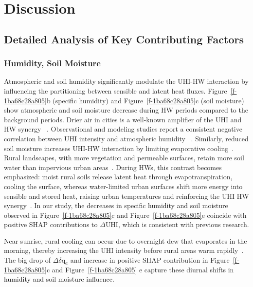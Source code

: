\section*{Discussion}




\subsection*{Detailed Analysis of Key Contributing Factors}



\subsubsection*{Humidity, Soil Moisture}Atmospheric and soil humidity significantly modulate the UHI-HW interaction by influencing the partitioning between sensible and latent heat fluxes. Figure~\ref{f-1ba68c28a805}b (specific humidity) and Figure~\ref{f-1ba68c28a805}c (soil moisture) show atmospheric and soil moisture decrease during HW periods compared to the background periods. Drier air in cities is a well-known amplifier of the UHI and HW synergy\unskip~\cite{2755510:33598950,2755510:33598924,2755510:33598925,2755510:33598926,2755510:33598952} . Observational and modeling studies report a consistent negative correlation between UHI intensity and atmospheric humidity\unskip~\cite{2755510:33598949,2755510:33598952,2755510:33598937} . Similarly, reduced soil moisture increases UHI-HW interaction by limiting evaporative cooling\unskip~\cite{2755510:33598950,2755510:33598925,2755510:33598926,2755510:33598915}. Rural landscapes, with more vegetation and permeable surfaces, retain more soil water than impervious urban areas\unskip~\cite{2755510:33598915,2755510:33598938}. During HWs, this contrast becomes emphasized: moist rural soils release latent heat through evapotranspiration, cooling the surface, whereas water-limited urban surfaces shift more energy into sensible and stored heat, raising urban temperatures and reinforcing the UHI HW synergy\unskip~\cite{2755510:33598924,2755510:33598925,2755510:33598926,2755510:33598935}. In our study, the decreases in specific humidity and soil moisture observed in Figure~\ref{f-1ba68c28a805}c and Figure~\ref{f-1ba68c28a805}e coincide with positive SHAP contributions to \ensuremath{\Delta }UHI, which is consistent with previous research.

Near sunrise, rural cooling can occur due to overnight dew that evaporates in the morning, thereby increasing the UHI intensity before rural areas warm rapidly\unskip~\cite{2755510:33598926}.  The big drop of \ensuremath{\Delta }\ensuremath{\delta }q\ensuremath{_{a}} and increase in positive SHAP contribution in Figure~\ref{f-1ba68c28a805}c and Figure~\ref{f-1ba68c28a805} e capture these diurnal shifts in humidity and soil moisture influence.

